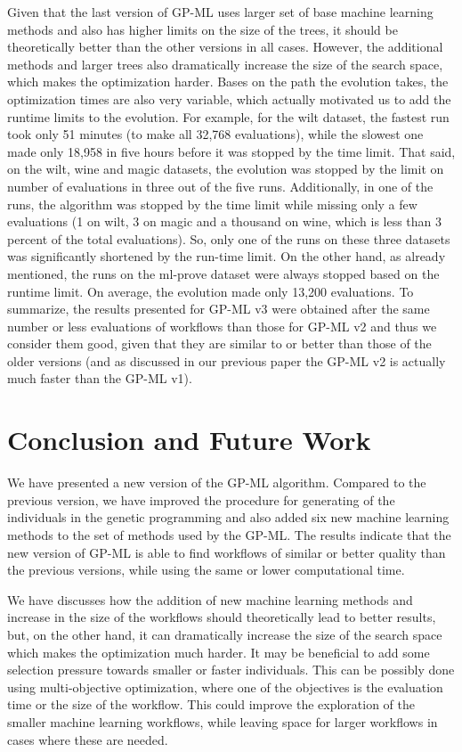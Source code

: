 \documentclass{ws-ijait}
\begin{document}
Given that the last version of GP-ML uses larger set of base machine learning
methods and also has higher limits on the size of the trees, it should be
theoretically better than the other versions in all cases. However, the
additional methods and larger trees also dramatically increase the size of the
search space, which makes the optimization harder. Bases on the path the
evolution takes, the optimization times are also very variable, which actually
motivated us to add the runtime limits to the evolution. For example, for the
wilt dataset, the fastest run took only 51 minutes (to make all 32,768
evaluations), while the slowest one made only 18,958 in five hours before it was
stopped by the time limit. That said, on the wilt, wine and magic datasets, the
evolution was stopped by the limit on number of evaluations in three out of the
five runs. Additionally, in one of the runs, the algorithm was stopped by the
time limit while missing only a few evaluations (1 on wilt, 3 on magic and a
thousand on wine, which is less than 3 percent of the total evaluations). So,
only one of the runs on these three datasets was significantly shortened by the
run-time limit. On the other hand, as already mentioned, the runs on the
ml-prove dataset were always stopped based on the runtime limit. On average, the
evolution made only 13,200 evaluations. To summarize, the results presented for
GP-ML v3 were obtained after the same number or less evaluations of workflows
than those for GP-ML v2 and thus we consider them good, given that they are
similar to or better than those of the older versions (and as discussed in our
previous paper\cite{7814654} the GP-ML v2 is actually much faster than the GP-ML
v1).

\section{Conclusion and Future Work}

We have presented a new version of the GP-ML algorithm. Compared to the previous
version, we have improved the procedure for generating of the individuals in the
genetic programming and also added six new machine learning methods to the set
of methods used by the GP-ML. The results indicate that the new version of GP-ML
is able to find workflows of similar or better quality than the previous
versions, while using the same or lower computational time. 

We have discusses how the addition of new machine learning methods and increase
in the size of the workflows should theoretically lead to better results, but,
on the other hand, it can dramatically increase the size of the search space
which makes the optimization much harder. It may be beneficial to add some
selection pressure towards smaller or faster individuals. This can be possibly
done using multi-objective optimization, where one of the objectives is the
evaluation time or the size of the workflow. This could improve the exploration
of the smaller machine learning workflows, while leaving space for larger
workflows in cases where these are needed.
\end{document}
